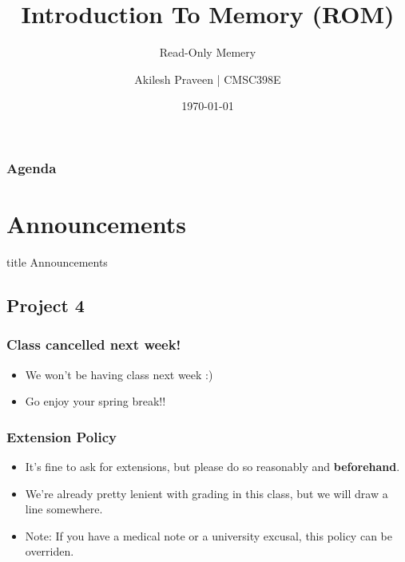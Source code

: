 \documentclass{beamer}
\title{Introduction To Memory (ROM)}
\subtitle{Read-Only Memery}
\author[CMSC389E]{Akilesh Praveen | CMSC398E}
\institute{UMD}
\date{\today}
\begin{document}
    \begin{frame}
        \titlepage
    \end{frame}
    
    \begin{frame}
        \frametitle{Agenda}
        \tableofcontents
    \end{frame}
    
    \section{Announcements}
    
        \begin{frame}
                \vfill
                \centering
                \begin{beamercolorbox}[sep=8pt,center,shadow=true,rounded=true]{title}
                    Announcements\par%
                \end{beamercolorbox}
                \vfill
             \end{frame}
    
        \subsection{Project 4}
        
            
            
            \begin{frame}
                \frametitle{Class cancelled next week!}
                \begin{itemize}
                    \item We won't be having class next week :)
                    \item Go enjoy your spring break!!
                    
                \end{itemize}
            \end{frame}
            
            \begin{frame}
            	\frametitle{Extension Policy}
            	\begin{itemize}
            		\item It's fine to ask for extensions, but please do so reasonably and \textbf{beforehand}.
            		\item We're already pretty lenient with grading in this class, but we will draw a line somewhere.
            		\item Note: If you have a medical note or a university excusal, this policy can be overriden.
            	\end{itemize}
            \end{frame}
            
\end{document}
